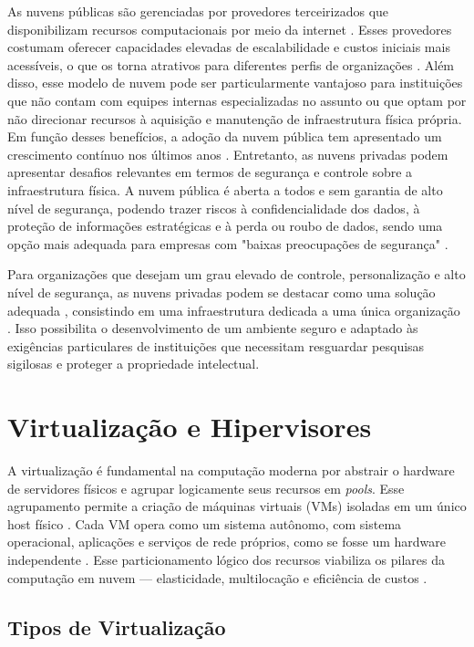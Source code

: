 As nuvens públicas são gerenciadas por provedores terceirizados que disponibilizam recursos computacionais por meio da internet \cite{carroll2011}. Esses provedores costumam oferecer capacidades elevadas de escalabilidade e custos iniciais mais acessíveis, o que os torna atrativos para diferentes perfis de organizações \cite{amajuoyi2024}. Além disso, esse modelo de nuvem pode ser particularmente vantajoso para instituições que não contam com equipes internas especializadas no assunto ou que optam por não direcionar recursos à aquisição e manutenção de infraestrutura física própria. Em função desses benefícios, a adoção da nuvem pública tem apresentado um crescimento contínuo nos últimos anos \cite{amajuoyi2024}. Entretanto, as nuvens privadas podem apresentar desafios relevantes em termos de segurança e controle sobre a infraestrutura física. A nuvem pública é aberta a todos e sem garantia de alto nível de segurança, podendo trazer riscos à confidencialidade dos dados, à proteção de informações estratégicas e à perda ou roubo de dados, sendo uma opção mais adequada para empresas com "baixas preocupações de segurança" \cite{sathya2023}.

Para organizações que desejam um grau elevado de controle, personalização e alto nível de segurança, as nuvens privadas podem se destacar como uma solução adequada \cite{swapna2023}, consistindo em uma infraestrutura dedicada a uma única organização \cite{mell2011}. Isso possibilita o desenvolvimento de um ambiente seguro e adaptado às exigências particulares de instituições que necessitam resguardar pesquisas sigilosas e proteger a propriedade intelectual. 

\section{Virtualização e Hipervisores}

A virtualização é fundamental na computação moderna por abstrair o hardware de servidores físicos e agrupar logicamente seus recursos em \textit{pools}. Esse agrupamento permite a criação de máquinas virtuais (VMs) isoladas em um único host físico \cite{carissimi2008, kominos2017}. Cada VM opera como um sistema autônomo, com sistema operacional, aplicações e serviços de rede próprios, como se fosse um hardware independente \cite{carissimi2008, smith2005}. Esse particionamento lógico dos recursos viabiliza os pilares da computação em nuvem — elasticidade, multilocação e eficiência de custos \cite{chawla2025}.

\subsection{Tipos de Virtualização}

